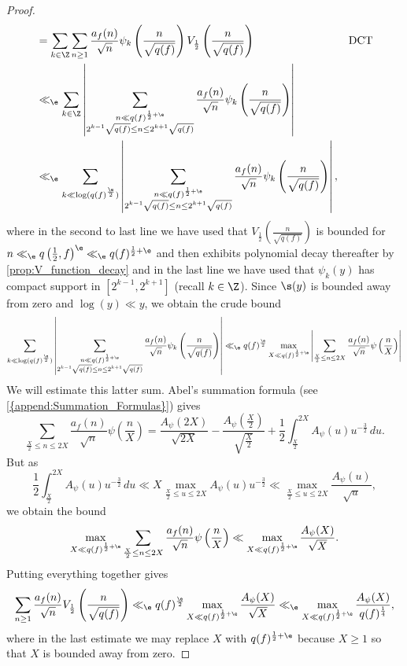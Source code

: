 \begin{proof}
\begin{align*}
        &= \sum_{k \in \Z}\sum_{n \ge 1}\frac{a_{f}(n)}{\sqrt{n}}\psi_{k}\left(\frac{n}{\sqrt{q(f)}}\right)V_{\frac{1}{2}}\left(\frac{n}{\sqrt{q(f)}}\right) && \text{DCT} \\
        &\ll_{\e} \sum_{k \in \Z}\left|\sum_{\substack{n \ll q(f)^{\frac{1}{2}+\e} \\ 2^{k-1}\sqrt{q(f)} \le n \le 2^{k+1}\sqrt{q(f)}}}\frac{a_{f}(n)}{\sqrt{n}}\psi_{k}\left(\frac{n}{\sqrt{q(f)}}\right)\right| \\
        &\ll_{\e} \sum_{k \ll \log(q(f)^{\frac{\e}{2}})}\left|\sum_{\substack{n \ll q(f)^{\frac{1}{2}+\e} \\ 2^{k-1}\sqrt{q(f)} \le n \le 2^{k+1}\sqrt{q(f)}}}\frac{a_{f}(n)}{\sqrt{n}}\psi_{k}\left(\frac{n}{\sqrt{q(f)}}\right)\right|,
      \end{align*}
      where in the second to last line we have used that $V_{\frac{1}{2}}\left(\frac{n}{\sqrt{q(f)}}\right)$ is bounded for $n \ll_{\e} q\left(\frac{1}{2},f\right)^{\e} \ll_{\e} q(f)^{\frac{1}{2}+\e}$ and then exhibits polynomial decay thereafter by \cref{prop:V_function_decay} and in the last line we have used that $\psi_{k}(y)$ has compact support in $[2^{k-1},2^{k+1}]$ (recall $k \in \Z$). Since $\s(y)$ is bounded away from zero and $\log(y) \ll y$, we obtain the crude bound
      \[
        \sum_{k \ll \log(q(f)^{\frac{\e}{2}})}\left|\sum_{\substack{n \ll q(f)^{\frac{1}{2}+\e} \\ 2^{k-1}\sqrt{q(f)} \le n \le 2^{k+1}\sqrt{q(f)}}}\frac{a_{f}(n)}{\sqrt{n}}\psi_{k}\left(\frac{n}{\sqrt{q(f)}}\right)\right| \ll_{\e} q(f)^{\frac{\e}{2}}\max_{X \ll q(f)^{\frac{1}{2}+\e}}\left|\sum_{\frac{X}{2} \le n \le 2X}\frac{a_{f}(n)}{\sqrt{n}}\psi\left(\frac{n}{X}\right)\right|
      \]
      We will estimate this latter sum. Abel's summation formula (see \cref{{append:Summation_Formulas}}) gives
      \[
        \sum_{\frac{X}{2} \le n \le 2X}\frac{a_{f}(n)}{\sqrt{n}}\psi\left(\frac{n}{X}\right) = \frac{A_{\psi}(2X)}{\sqrt{2X}}-\frac{A_{\psi}\left(\frac{X}{2}\right)}{\sqrt{\frac{X}{2}}}+\frac{1}{2}\int_{\frac{X}{2}}^{2X}A_{\psi}(u)u^{-\frac{3}{2}}\,du.
      \]
      But as
      \[
        \frac{1}{2}\int_{\frac{X}{2}}^{2X}A_{\psi}(u)u^{-\frac{3}{2}}\,du \ll X\max_{\frac{X}{2} \le u \le 2X}A_{\psi}(u)u^{-\frac{3}{2}} \ll \max_{\frac{X}{2} \le u \le 2X}\frac{A_{\psi}(u)}{\sqrt{u}},
      \]
      we obtain the bound
      \[
        \max_{X \ll q(f)^{\frac{1}{2}+\e}}\sum_{\frac{X}{2} \le n \le 2X}\frac{a_{f}(n)}{\sqrt{n}}\psi\left(\frac{n}{X}\right) \ll \max_{X \ll q(f)^{\frac{1}{2}+\e}}\frac{A_{\psi}(X)}{\sqrt{X}}.
      \]
      Putting everything together gives
      \[
        \sum_{n \ge 1}\frac{a_{f}(n)}{\sqrt{n}}V_{\frac{1}{2}}\left(\frac{n}{\sqrt{q(f)}}\right) \ll_{\e} q(f)^{\frac{\e}{2}}\max_{X \ll q(f)^{\frac{1}{2}+\e}}\frac{A_{\psi}(X)}{\sqrt{X}} \ll_{\e} \max_{X \ll q(f)^{\frac{1}{2}+\e}}\frac{A_{\psi}(X)}{q(f)^{\frac{1}{4}}},
      \]
      where in the last estimate we may replace $X$ with $q(f)^{\frac{1}{2}+\e}$ because $X \ge 1$ so that $X$ is bounded away from zero.
    \end{proof}